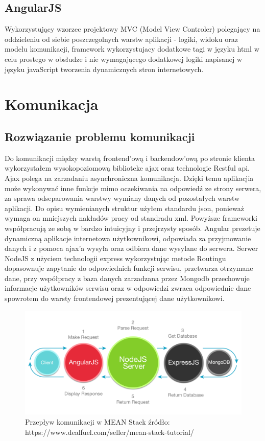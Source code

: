 \documentclass[12pt]{report}
\begin{document}
\subsection{AngularJS}
Wykorzystujący wzorzec projektowy MVC (Model View Controler) polegający na oddzieleniu od siebie poszczegolnych warstw aplikacji - logiki, widoku oraz modelu komunikacji, framework wykorzystujacy dodatkowe tagi w języku html w celu prostego w obsłudze i nie wymagającego dodatkowej logiki napisanej w języku javaScript tworzenia dynamicznych stron internetowych.

\section{Komunikacja}

\subsection{Rozwiązanie problemu komunikacji}
Do komunikacji między warstą frontend'ową i backendow'ową po stronie klienta wykorzystałem wysokopoziomową biblioteke ajax oraz technologie Restful api. 
Ajax polega na zarzadaniu asynchroniczna komunikacja. 
Dzięki temu aplikacjia może wykonywać inne funkcje mimo oczekiwania na odpowiedź ze strony serwera, za sprawa odseparowania warstwy wymiany danych od pozostałych warstw aplikacji.
Do opisu wymienianych struktur użyłem standardu json, ponieważ wymaga on mniejszych nakładów pracy od standradu xml. 
Powyższe frameworki współpracują ze sobą w bardzo intuicyjny i przejrzysty sposób. 
Angular prezetuje dynamiczną aplikacje internetowa użytkownikowi, odpowiada za przyjmowanie danych i z pomoca ajax'a wysyła oraz odbiera dane wysylane do serwera. 
Serwer NodeJS z użyciem technologii express wykorzystując metode Routingu dopasownuje zapytanie do odpowiednich funkcji serwisu, przetwarza otrzymane dane, przy współpracy z baza danych zarzadzana przez Mongodb przechowuje informacje użytkowników serwisu oraz w odpowiedzi zwraca odpowiednie dane spowrotem do warsty frontendowej prezentującej dane użytkownikowi. 

\begin{figure}[!hb]
\centering
\includegraphics[width=\textwidth,height=\textheight,keepaspectratio]{Meanex.png}
\caption{Przepływ komunikacji w MEAN Stack źródło: https://www.dealfuel.com/seller/mean-stack-tutorial/}
\end{figure}
\end{document}
